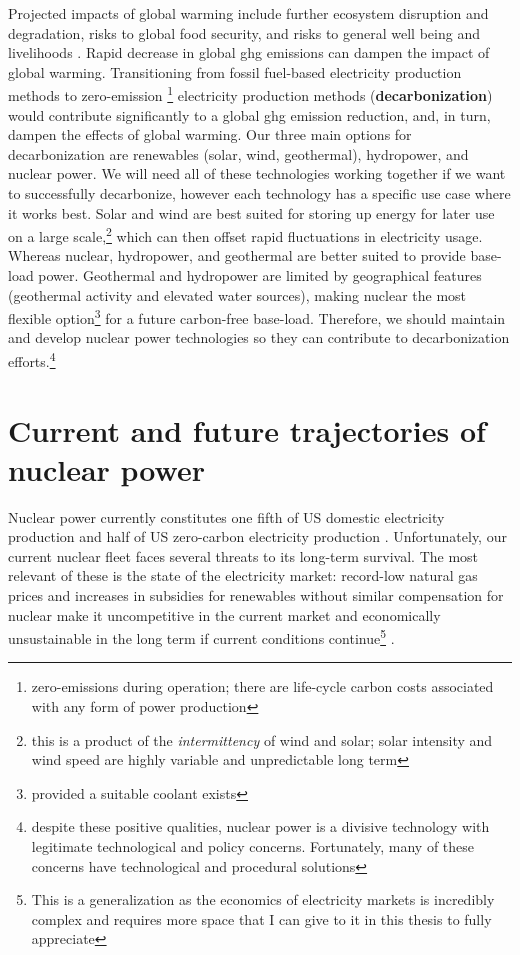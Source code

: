 Projected impacts of global warming include further ecosystem disruption and
degradation, risks to global food security, and risks to general well being and
livelihoods \cite{hans_portner_2022_ts}.  Rapid decrease in global \Gls{ghg}
emissions can dampen the impact of global warming. Transitioning from fossil
fuel-based electricity production methods to zero-emission
\footnote{zero-emissions during operation; there are life-cycle carbon costs
associated with any form of power production} electricity production methods
(\textbf{decarbonization}) would contribute significantly to a global \Gls{ghg}
emission reduction, and, in turn, dampen the effects of global
warming\cite{minal_pathak_2022_ts}. Our three main options for decarbonization
are renewables (solar, wind, geothermal), hydropower, and nuclear power. We will
need all of these technologies working together if we want to successfully
decarbonize, however each technology has a specific use case where it works
best. Solar and wind are best suited for storing up energy for later use on a
large scale,\footnote{this is a product of the {\it intermittency} of wind and
solar; solar intensity and wind speed are highly variable and unpredictable
long term} which can then offset rapid fluctuations in electricity usage.
Whereas nuclear, hydropower, and geothermal are better suited to provide
base-load power\cite{eia_electricity_2021}. Geothermal and hydropower are
limited by geographical features (geothermal activity and elevated water
sources), making nuclear the most flexible option\footnote{provided a suitable
coolant exists} for a future carbon-free base-load. Therefore, we should
maintain and develop nuclear power technologies so they can contribute to
decarbonization efforts.\footnote{despite these positive qualities, nuclear
power is a divisive technology with legitimate technological and policy
concerns. Fortunately, many of these concerns have technological and procedural
solutions}

\section{Current and future trajectories of nuclear power}%
\label{sec:current_and_future_trajectories_of_nuclear_power}
Nuclear power currently constitutes one fifth of US domestic electricity
production and half of US zero-carbon electricity production
\cite{eia_faq_2021} \cite{doene_facts_2021}. Unfortunately, our current nuclear
fleet faces several threats to its long-term survival. The most relevant of
these is the state of the electricity market: record-low natural gas prices and
increases in subsidies for renewables without similar compensation for
nuclear make it uncompetitive in the current market and economically unsustainable in the
long term if current conditions continue\footnote{This is a generalization as
the economics of electricity markets is incredibly complex and requires more space that I can give to it
in this thesis to fully appreciate} \cite{szilard_economic_2016}.

